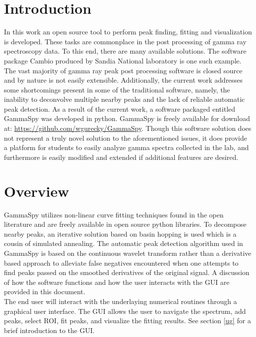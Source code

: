 \documentclass[10pt]{article}
\begin{document}
\section{Introduction}
In this work an open source tool to perform peak finding, fitting and visualization is developed.  These tasks
are commonplace in the post processing of gamma ray spectroscopy data.
To this end, there are many available solutions.  The software
package Cambio produced by Sandia National laboratory is one such example.  The vast majority
of gamma ray peak post processing software is closed source and by nature is not easily extensible.
Additionally, the current work addresses some shortcomings present in some of the traditional
software, namely, the inability to deconvolve multiple nearby peaks and the lack of reliable automatic
peak detection.  As a result of the current work, a software packaged entitled GammaSpy was developed in python.
GammaSpy is freely available for download at: \url{https://github.com/wgurecky/GammaSpy}.  Though
this software solution does not represent a truly novel solution to the aforementioned issues, it does
provide a platform for students to easily analyze gamma spectra collected in the lab, and furthermore
is easily modified and extended if additional features are desired.

\section{Overview}

GammaSpy utilizes non-linear curve fitting techniques found in the open
literature and are freely available in open source python libraries.  To
decompose nearby peaks, an iterative solution based on basin hopping is used
which is a cousin of simulated annealing.  The automatic peak detection
algorithm used in GammaSpy is based on the continuous wavelet transform rather
than a derivative based approach to alleviate false negatives encountered when
one attempts to find peaks passed on the smoothed derivatives of the original
signal.  A discussion of how the software functions and how the user interacts
with the GUI are provided in this document. \\

The end user will interact with the underlaying numerical routines through a
graphical user interface. The GUI allows the user to navigate the spectrum, add
peaks, select ROI, fit peaks, and visualize the fitting results.
See section \ref{ug} for a brief introduction to the GUI.
\end{document}
